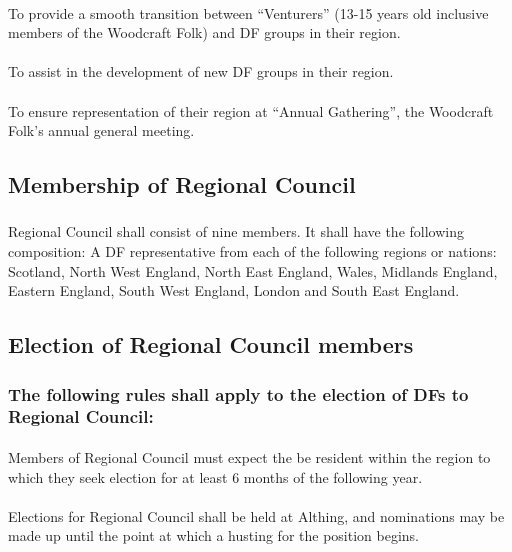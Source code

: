 \documentclass[a4paper, 12pt]{report}
\begin{document}
\paragraph{}
To provide a smooth transition between ``Venturers'' (13-15 years old inclusive members of the Woodcraft Folk) and DF groups in their region.
\paragraph{}
To assist in the development of new DF groups in their region.
\paragraph{}
To ensure representation of their region at ``Annual Gathering'', the Woodcraft Folk's annual general meeting.

\subsection{Membership of Regional Council}
\label{sec:rcmembership}
\subsubsection{}
Regional Council shall consist of nine members. It shall have the following composition: A DF representative from each of the following regions or nations: Scotland, North West England, North East England, Wales, Midlands England, Eastern England, South West England, London and South East England.
\subsection{Election of Regional Council members}
\subsubsection{The following rules shall apply to the election of DFs to Regional Council:}
\paragraph{}
\label{sec:regionalresidency}
Members of Regional Council must expect the be resident within the region to which they seek election for at least 6 months of the following year.
\paragraph{}
Elections for Regional Council shall be held at Althing, and nominations may be made up until the point at which a husting for the position begins.
\end{document}
